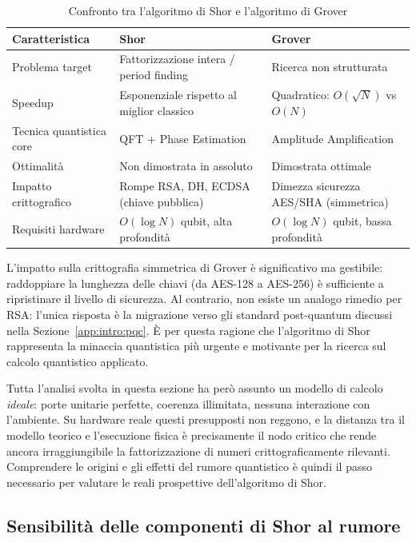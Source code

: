 \begin{table}[H]
\centering
\small
\begin{tabular}{@{}lp{5cm}p{5cm}@{}}
\toprule
\textbf{Caratteristica} & \textbf{Shor} & \textbf{Grover} \\
\midrule
Problema target          & Fattorizzazione intera / period finding & Ricerca non strutturata \\[2pt]
Speedup                  & Esponenziale rispetto al miglior classico & Quadratico: $O(\sqrt{N})$ vs $O(N)$ \\[2pt]
Tecnica quantistica core & QFT + Phase Estimation          & Amplitude Amplification \\[2pt]
Ottimalità               & Non dimostrata in assoluto      & Dimostrata ottimale \cite{bennett1997} \\[2pt]
Impatto crittografico    & Rompe RSA, DH, ECDSA (chiave pubblica) & Dimezza sicurezza AES/SHA (simmetrica) \\[2pt]
Requisiti hardware       & $O(\log N)$ qubit, alta profondità & $O(\log N)$ qubit, bassa profondità \\
\bottomrule
\end{tabular}
\caption{Confronto tra l'algoritmo di Shor e l'algoritmo di Grover}
\end{table}

L'impatto sulla crittografia simmetrica di Grover è significativo ma gestibile: raddoppiare la lunghezza delle chiavi (da AES-128 a AES-256) è sufficiente a ripristinare il livello di sicurezza. Al contrario, non esiste un analogo rimedio per RSA: l'unica risposta è la migrazione verso gli standard post-quantum discussi nella Sezione~\ref{app:intro:pqc}. È per questa ragione che l'algoritmo di Shor rappresenta la minaccia quantistica più urgente e motivante per la ricerca sul calcolo quantistico applicato.

Tutta l'analisi svolta in questa sezione ha però assunto un modello di calcolo \textit{ideale}: porte unitarie perfette, coerenza illimitata, nessuna interazione con l'ambiente. Su hardware reale questi presupposti non reggono, e la distanza tra il modello teorico e l'esecuzione fisica è precisamente il nodo critico che rende ancora irraggiungibile la fattorizzazione di numeri crittograficamente rilevanti. Comprendere le origini e gli effetti del rumore quantistico è quindi il passo necessario per valutare le reali prospettive dell'algoritmo di Shor.

\subsection{Sensibilità delle componenti di Shor al rumore}
\label{app:shor_rumore_esteso}

